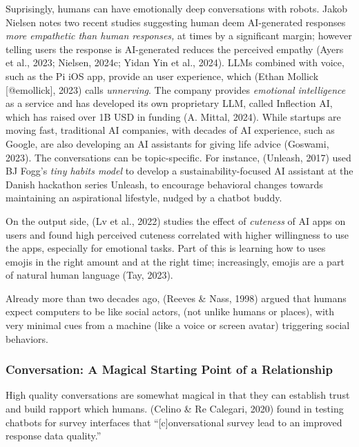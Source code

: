 \documentclass[
  12pt,
  letterpaper,
  DIV=11,
  numbers=noendperiod]{scrartcl}
\begin{document}
\let\pandoctableshortcapt\relax

Suprisingly, humans can have emotionally deep conversations with robots.
Jakob Nielsen notes two recent studies suggesting human deem
AI-generated responses \emph{more empathetic than human responses,} at
times by a significant margin; however telling users the response is
AI-generated reduces the perceived empathy (Ayers et al., 2023; Nielsen,
2024c; Yidan Yin et al., 2024). LLMs combined with voice, such as the Pi
iOS app, provide an user experience, which (Ethan Mollick
{[}@emollick{]}, 2023) calls \emph{unnerving}. The company provides
\emph{emotional intelligence} as a service and has developed its own
proprietary LLM, called Inflection AI, which has raised over 1B USD in
funding (A. Mittal, 2024). While startups are moving fast, traditional
AI companies, with decades of AI experience, such as Google, are also
developing an AI assistants for giving life advice (Goswami, 2023). The
conversations can be topic-specific. For instance, (Unleash, 2017) used
BJ Fogg's \emph{tiny habits model} to develop a sustainability-focused
AI assistant at the Danish hackathon series Unleash, to encourage
behavioral changes towards maintaining an aspirational lifestyle, nudged
by a chatbot buddy.

On the output side, (Lv et al., 2022) studies the effect of
\emph{cuteness} of AI apps on users and found high perceived cuteness
correlated with higher willingness to use the apps, especially for
emotional tasks. Part of this is learning how to uses emojis in the
right amount and at the right time; increasingly, emojis are a part of
natural human language (Tay, 2023).

Already more than two decades ago, (Reeves \& Nass, 1998) argued that
humans expect computers to be like social actors, (not unlike humans or
places), with very minimal cues from a machine (like a voice or screen
avatar) triggering social behaviors.

\subsubsection{Conversation: A Magical Starting Point of a
Relationship}\label{conversation-a-magical-starting-point-of-a-relationship}

High quality conversations are somewhat magical in that they can
establish trust and build rapport which humans. (Celino \& Re Calegari,
2020) found in testing chatbots for survey interfaces that
``{[}c{]}onversational survey lead to an improved response data
quality.''
\end{document}
